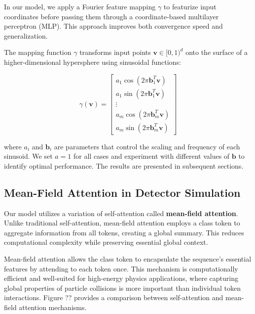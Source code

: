 In our model, we apply a Fourier feature mapping \( \gamma \) to featurize input coordinates before passing them through a coordinate-based multilayer perceptron (MLP). This approach improves both convergence speed and generalization.

The mapping function \( \gamma \) transforms input points \( \mathbf{v} \in [0, 1)^d \) onto the surface of a higher-dimensional hypersphere using sinusoidal functions:

\begin{equation}
\gamma(\mathbf{v}) = 
\begin{bmatrix}
a_1 \cos(2 \pi \mathbf{b}_1^T \mathbf{v}) \\ 
a_1 \sin(2 \pi \mathbf{b}_1^T \mathbf{v}) \\ 
\vdots \\ 
a_m \cos(2 \pi \mathbf{b}_m^T \mathbf{v}) \\ 
a_m \sin(2 \pi \mathbf{b}_m^T \mathbf{v})
\end{bmatrix}
\end{equation}

where \( a_i \) and \( \mathbf{b}_i \) are parameters that control the scaling and frequency of each sinusoid. We set \( a = 1 \) for all cases and experiment with different values of \( \mathbf{b} \) to identify optimal performance. The results are presented in subsequent sections.

\subsection{Mean-Field Attention in Detector Simulation}
Our model utilizes a variation of self-attention called \textbf{mean-field attention}. Unlike traditional self-attention, mean-field attention employs a class token to aggregate information from all tokens, creating a global summary. This reduces computational complexity while preserving essential global context.

Mean-field attention allows the class token to encapsulate the sequence's essential features by attending to each token once. This mechanism is computationally efficient and well-suited for high-energy physics applications, where capturing global properties of particle collisions is more important than individual token interactions. Figure ?? provides a comparison between self-attention and mean-field attention mechanisms.

